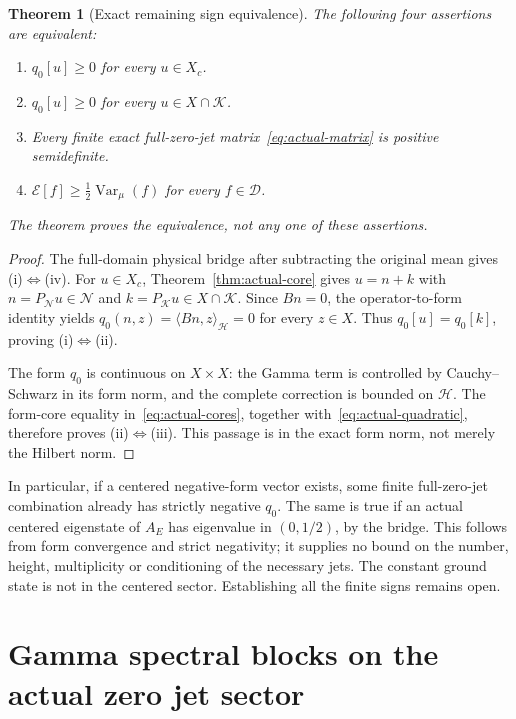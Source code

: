 \documentclass[11pt,a4paper]{article}
\numberwithin{equation}{section}
\newtheorem{theorem}{Theorem}[section]
\theoremstyle{definition}\newtheorem{definition}[theorem]{Definition}
\theoremstyle{remark}\newtheorem{remark}[theorem]{Remark}
\newcommand{\E}{\mathcal E}\newcommand{\D}{\mathcal D}
\newcommand{\Hh}{\mathcal H}\newcommand{\Hw}{\mathcal H}
\newcommand{\tg}{t_\Gamma}\newcommand{\cg}{c_\Gamma}
\newcommand{\dom}{\operatorname{Dom}}\newcommand{\Var}{\operatorname{Var}}
\newcommand{\ip}[2]{\langle#1,#2\rangle}\newcommand{\norm}[1]{\lVert#1\rVert}\newcommand{\abs}[1]{\lvert#1\rvert}
\newcommand{\Nn}{\mathcal N}\newcommand{\Ii}{\mathcal I}\newcommand{\Zz}{\mathcal Z}
\newcommand{\Kk}{\mathcal K}\newcommand{\Aa}{\mathcal A}\newcommand{\Ff}{\mathcal F}
\begin{document}
\begin{theorem}[Exact remaining sign equivalence]\label{thm:actual-sign}
The following four assertions are equivalent:
\begin{enumerate}[label=\textup{(\roman*)}]
\item $q_0[u]\ge0$ for every $u\in X_c$.
\item $q_0[u]\ge0$ for every $u\in X\cap\Kk$.
\item Every finite exact full-zero-jet matrix~\eqref{eq:actual-matrix} is positive semidefinite.
\item $\E[f]\ge\tfrac12\Var_\mu(f)$ for every $f\in\D$.
\end{enumerate}
The theorem proves the equivalence, not any one of these assertions.
\end{theorem}
\begin{proof}
The full-domain physical bridge after subtracting the original mean gives (i)$\Leftrightarrow$(iv). For $u\in X_c$, Theorem~\ref{thm:actual-core} gives $u=n+k$ with $n=P_{\Nn}u\in\Nn$ and $k=P_{\Kk}u\in X\cap\Kk$. Since $Bn=0$, the operator-to-form identity yields $q_0(n,z)=\ip{Bn}{z}_{\Hh}=0$ for every $z\in X$. Thus $q_0[u]=q_0[k]$, proving (i)$\Leftrightarrow$(ii).

The form $q_0$ is continuous on $X\times X$: the Gamma term is controlled by Cauchy--Schwarz in its form norm, and the complete correction is bounded on $\Hh$. The form-core equality in~\eqref{eq:actual-cores}, together with~\eqref{eq:actual-quadratic}, therefore proves (ii)$\Leftrightarrow$(iii). This passage is in the exact form norm, not merely the Hilbert norm.
\end{proof}

In particular, if a centered negative-form vector exists, some finite full-zero-jet combination already has strictly negative $q_0$. The same is true if an actual centered eigenstate of $A_E$ has eigenvalue in $(0,1/2)$, by the bridge. This follows from form convergence and strict negativity; it supplies no bound on the number, height, multiplicity or conditioning of the necessary jets. The constant ground state is not in the centered sector. Establishing all the finite signs remains open.


\section{Gamma spectral blocks on the actual zero jet sector}
\label{gb:sec:bridge}
\end{document}
